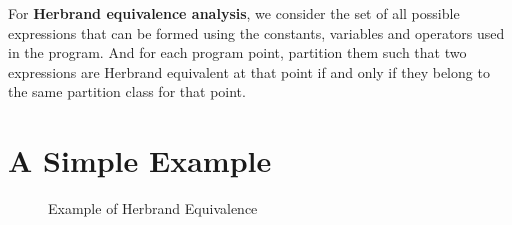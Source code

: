 For \textbf{Herbrand equivalence analysis}, we consider the set of all 
possible expressions that can be formed using the constants, 
variables and operators used in the program. And for each program 
point, partition them such that two expressions are Herbrand 
equivalent at that point if and only if they belong to the same 
partition class for that point.

\section{A Simple Example}
\label{sec:ASimpleExample}

\begin{figure}[!ht]
\label{fig:HerbrandEquivalenceTrans}
    \caption{Example of Herbrand Equivalence}
\end{figure}

